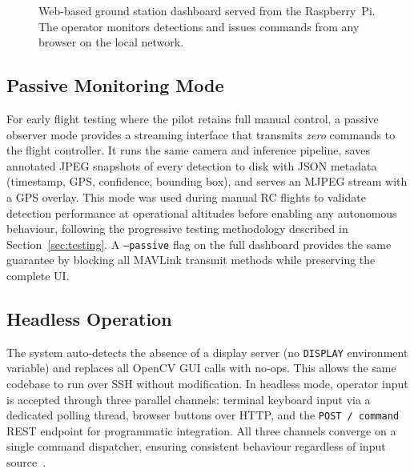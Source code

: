 \begin{figure}[ht]
  \centering
  \caption{Web-based ground station dashboard served from the Raspberry~Pi. The operator monitors detections and issues commands from any browser on the local network.}
  \label{fig:dashboard}
\end{figure}

\subsection{Passive Monitoring Mode}\label{sec:gs-passive}

For early flight testing where the pilot retains full manual control, a passive observer mode provides a streaming interface that transmits \emph{zero} commands to the flight controller. It runs the same camera and inference pipeline, saves annotated JPEG snapshots of every detection to disk with JSON metadata (timestamp, GPS, confidence, bounding box), and serves an MJPEG stream with a GPS overlay. This mode was used during manual RC flights to validate detection performance at operational altitudes before enabling any autonomous behaviour, following the progressive testing methodology described in Section~\ref{sec:testing}. A \texttt{--passive} flag on the full dashboard provides the same guarantee by blocking all MAVLink transmit methods while preserving the complete UI.

\subsection{Headless Operation}\label{sec:gs-headless}

The system auto-detects the absence of a display server (no \texttt{DISPLAY} environment variable) and replaces all OpenCV GUI calls with no-ops. This allows the same codebase to run over SSH without modification. In headless mode, operator input is accepted through three parallel channels: terminal keyboard input via a dedicated polling thread, browser buttons over HTTP, and the \texttt{POST~/ command} REST endpoint for programmatic integration. All three channels converge on a single command dispatcher, ensuring consistent behaviour regardless of input source~\cite{goodrich2007human}.

